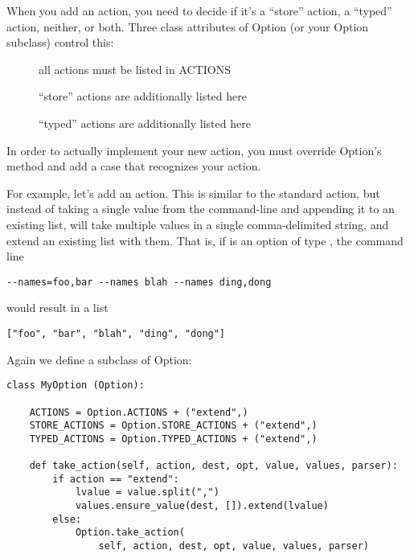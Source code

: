 When you add an action, you need to decide if it's a ``store'' action, a
``typed'' action, neither, or both.  Three class attributes of
Option (or your Option subclass) control this:
\begin{description}
\item[]
all actions must be listed in ACTIONS
\item[]
``store'' actions are additionally listed here
\item[]
``typed'' actions are additionally listed here
\end{description}

In order to actually implement your new action, you must override
Option's  method and add a case that recognizes your
action.

For example, let's add an  action.  This is similar to the
standard  action, but instead of taking a single value from
the command-line and appending it to an existing list,  will
take multiple values in a single comma-delimited string, and extend an
existing list with them.  That is, if  is an 
option of type , the command line
\begin{verbatim}
--names=foo,bar --names blah --names ding,dong
\end{verbatim}

would result in a list
\begin{verbatim}
["foo", "bar", "blah", "ding", "dong"]
\end{verbatim}

Again we define a subclass of Option:
\begin{verbatim}
class MyOption (Option):

    ACTIONS = Option.ACTIONS + ("extend",)
    STORE_ACTIONS = Option.STORE_ACTIONS + ("extend",)
    TYPED_ACTIONS = Option.TYPED_ACTIONS + ("extend",)

    def take_action(self, action, dest, opt, value, values, parser):
        if action == "extend":
            lvalue = value.split(",")
            values.ensure_value(dest, []).extend(lvalue)
        else:
            Option.take_action(
                self, action, dest, opt, value, values, parser)
\end{verbatim}

